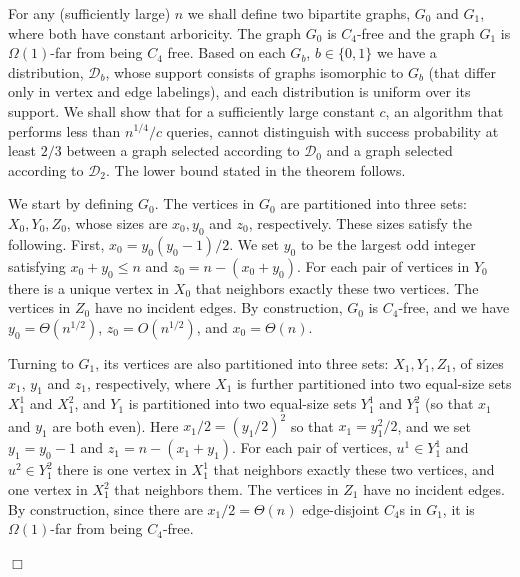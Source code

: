 \documentclass{article}
\newcommand{\bitset}{\{0,1\}}
\newcommand{\calD}{{\mathcal{D}}}
\newenvironment{proof}{\smallskip\noindent{\bf Proof:}}%
        {\hspace*{\fill}$\Box$\par}
\newcommand{\commentt}[1]{ {}}
\newcommand{\SodaReb}[1]{{ #1}}
\newcommand{\ICALPCR}[1]{{#1}}
\begin{document}
\begin{proof}
For any (sufficiently large) $n$ we shall define two bipartite graphs, $G_0$ and $G_1$, where both have constant arboricity. The graph $G_0$ is $C_4$-free and  the graph $G_1$ is $\Omega(1)$-far from being $C_4$ free.
Based on each $G_b$, $b\in \bitset$ we have a distribution, $\calD_b$, whose support consists of graphs isomorphic to $G_b$ (that differ only in vertex and edge labelings), and each distribution is uniform over its support.
We shall show that for a sufficiently large constant $c$, an algorithm that performs less than $n^{1/4}/c$ queries, cannot distinguish with success probability at least $2/3$ between a graph selected according to $\calD_0$ and a graph selected according to $\calD_2$. The lower bound stated in the theorem follows.

We start by defining $G_0$. The vertices in $G_0$ are partitioned into three sets: $X_0,Y_0,Z_0$, \SodaReb{whose sizes are $x_0,y_0$ and $z_0$, respectively. These sizes satisfy the following. First,}
 $x_0 = y_0(y_0-1)/2$. We set $y_0$ to be the largest odd integer satisfying 
 \ICALPCR{$x_0 + y_0 \leq n$}
 and $z_0 = n-(x_0+y_0)$.
For each pair of vertices in $Y_0$ there is a unique vertex in $X_0$ that neighbors exactly these two vertices.
The vertices in $Z_0$ have no incident edges.
By construction, $G_0$ is $C_4$-free, and we have $y_0 = \Theta(n^{1/2})$, 
\ICALPCR{$z_0 = O(n^{1/2})$,}
and $x_0 = \Theta(n)$.

Turning to $G_1$, its vertices are also partitioned into three sets: $X_1,Y_1,Z_1$, of sizes $x_1$, $y_1$ and $z_1$, respectively, where $X_1$ is further partitioned into two equal-size sets $X_1^1$ and $X_1^2$, and $Y_1$ is partitioned into two equal-size sets $Y_1^1$ and $Y_1^2$ (so that $x_1$ and $y_1$ are both even).
Here $x_1/2 = (y_1/2)^2$ so that $x_1 = y_1^2/2$, and we set 
\ICALPCR{
$y_1 = y_0 - 1$
}
and $z_1 = n- (x_1+y_1)$. For each pair of vertices, $u^1 \in Y_1^1$ and $u^2 \in Y_1^2$ there is one vertex in $X_1^1$ that neighbors exactly these two vertices, and one vertex in $X_1^2$ that neighbors them. The vertices in $Z_1$ have
no incident edges. By construction, since there are $x_1/2 = \Theta(n)$ edge-disjoint $C_4$s in $G_1$, it is $\Omega(1)$-far from being $C_4$-free.


\end{proof}
\end{document}
